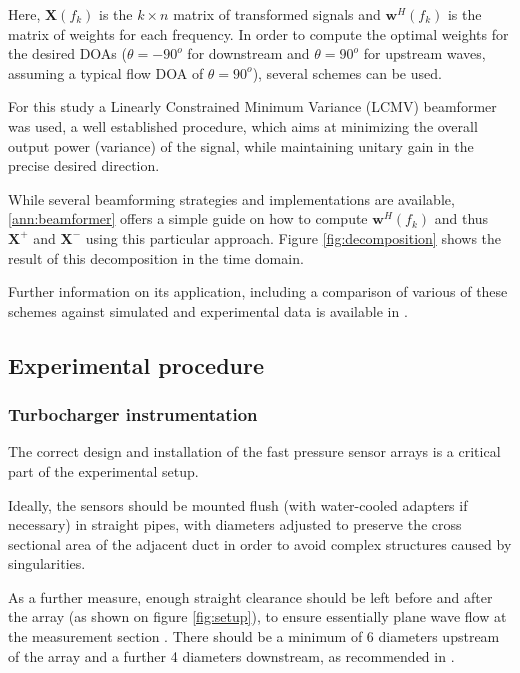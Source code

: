 Here, $\mathbf X(f_k)$ is the $k \times n$ matrix of transformed signals and $\mathbf w^H(f_k)$ is the matrix of weights for each frequency. In order to compute the optimal weights for the desired DOAs ($\theta=-90^o$ for downstream and $\theta=90^o$ for upstream waves, assuming a typical flow DOA of $\theta=90^o$), several schemes can be used.

For this study a Linearly Constrained Minimum Variance (LCMV) beamformer was  used, a well established procedure, which aims at minimizing the overall output power (variance) of the signal, while maintaining unitary gain in the precise desired direction.

While several beamforming strategies and implementations are available, \ref{ann:beamformer} offers a simple guide on how to compute $\mathbf w^H(f_k)$ and thus $\mathbf X^+$ and $\mathbf X^-$ using this particular approach. Figure \ref{fig:decomposition} shows the result of this decomposition in the time domain.

Further information on its application, including a comparison of various of these schemes against simulated and experimental data is available in \cite{pinero2000estimation}.

\subsection{Experimental procedure}
\label{sec:experimental_procedure}

\subsubsection{Turbocharger instrumentation}
\label{sub:turbocharger_instrumentation}

The correct design and installation of the fast pressure sensor arrays
is a critical part of the experimental setup.

Ideally, the sensors should be mounted flush (with water-cooled adapters if necessary) in straight pipes, with diameters adjusted to preserve the cross sectional area of the adjacent duct in order to avoid complex structures caused by singularities.

As a further measure, enough straight clearance should be left before and after the array (as shown on figure \ref{fig:setup}), to ensure essentially plane wave flow at the measurement section \cite{holland2000measurement}. There should be a minimum of 6 diameters upstream of the array and a further 4 diameters downstream, as recommended in \cite{torregrosa2005exp}.

